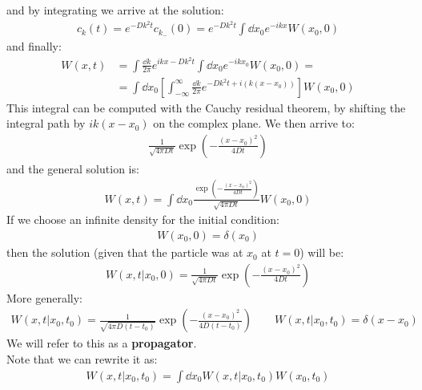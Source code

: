 \documentclass[../template.tex]{subfiles}
\begin{document}
and by integrating we arrive at the solution:
\begin{align*}
    c_k(t) = e^{-D k^2 t} c_{k_-}(0) = e^{-D k^2 t} \int \dd{x_0} e^{-ikx} W(x_0,0)
\end{align*}
and finally:
\begin{align*}
    W(x,t) &= \int \frac{\dd{k}}{2 \pi} e^{ikx - Dk^2 t} \int \dd{x_0} e^{-ik x_0} W(x_0, 0) =\\
    &= \int \dd{x_0} \left[\int_{-\infty}^{\infty}  \frac{\dd{k}}{2 \pi}  e^{-D k^2 t + i(k(x-x_0))}\right] W(x_0, 0)
\end{align*}
This integral can be computed with the Cauchy residual theorem, by shifting the integral path by $ik(x-x_0)$ on the complex plane. We then arrive to:
\begin{align*}
    \frac{1}{\sqrt{4 \pi D t}} \exp\left(-\frac{(x-x_0)^2}{4 D t} \right) 
\end{align*} 
and the general solution is:
\begin{align*}
    W(x,t) = \int \dd{x_0} \frac{\exp \left(-\frac{(x-x_0)^2}{4 D t} \right)}{\sqrt{4 \pi D t}} W(x_0, 0) 
\end{align*}
If we choose an infinite density for the initial condition:
\begin{align*}
    W(x_0, 0) = \delta(x_0)
\end{align*}
then the solution (given that the particle was at $x_0$ at $t=0$) will be:
\begin{align*}
    W(x,t | x_0, 0) = \frac{1}{\sqrt{4 \pi D t}} \exp \left(-\frac{(x-x_0)^2}{4 D t} \right) 
\end{align*}
More generally:
\begin{align*}
    W(x,t | x_0, t_0 ) = \frac{1}{\sqrt{4 \pi D (t-t_0 )}} \exp \left(-\frac{(x-x_0 )^2}{4 D (t-t_0)} \right) \qquad W(x,t|x_0, t_0 ) = \delta(x- x_0)
\end{align*}
We will refer to this as a \textbf{propagator}.\\
Note that we can rewrite it as:
\begin{align*}
    W(x,t|x_0, t_0 ) = \int \dd{x_0 } W(x,t|x_0, t_0) W(x_0, t_0)
\end{align*} 
\end{document}
